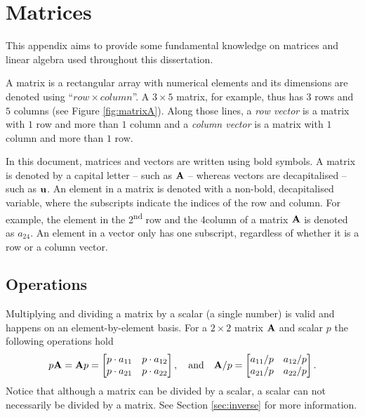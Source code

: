 \chapter{Matrices}\label{app:matrices}
This appendix aims to provide some fundamental knowledge on matrices and linear algebra used throughout this dissertation. 

A matrix is a rectangular array with numerical elements and its dimensions are denoted using ``$row \times column$''. A $3\times 5$ matrix, for example, thus has $3$ rows and $5$ columns (see Figure \ref{fig:matrixA}). Along those lines, a \textit{row vector} is a matrix with $1$ row and more than $1$ column and a \textit{column vector} is a matrix with $1$ column and more than $1$ row.  

In this document, matrices and vectors are written using bold symbols. %
A matrix is denoted by a capital letter -- such as $\mathbf{A}$ -- whereas vectors are decapitalised -- such as $\mathbf{u}$. An element in a matrix is denoted with a non-bold, decapitalised variable, where the subscripts indicate the indices of the row and column. For example, the element in the 2\textsuperscript{nd} row and the 4\th column of a matrix $\mathbf{A}$ is denoted as $a_{24}$. An element in a vector only has one subscript, regardless of whether it is a row or a column vector.

\section{Operations}
Multiplying and dividing a matrix by a scalar (a single number) is valid and happens on an element-by-element basis. For a $2\times 2$ matrix $\mathbf{A}$ and scalar $p$ the following operations hold
\begin{equation*}
        p \mathbf{A} = \mathbf{A} p = \begin{bmatrix}
        p\cdot a_{11}& p\cdot a_{12}\\
        p\cdot a_{21} & p\cdot a_{22}
    \end{bmatrix}, \quad \text{and} \quad \mathbf{A} / p= \begin{bmatrix}
            a_{11}/p& a_{12}/p\\
            a_{21}/p & a_{22}/p
    \end{bmatrix}.
\end{equation*}
Notice that although a matrix can be divided by a scalar, a scalar can not necessarily be divided by a matrix. See Section \ref{sec:inverse} for more information.

